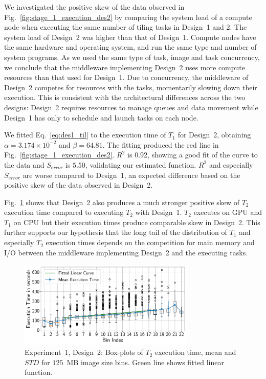 We investigated the positive skew of the data observed in 
Fig.~\ref{fig:stage_1_execution_des2} by comparing the system load of a 
compute node when executing the same number of tiling tasks in Design~1 and 2. 
The system load of Design~2 was higher than that of Design~1. Compute nodes 
have the same hardware and operating system, and run the same type and number 
of system programs. As we used the same type of task, image and task 
concurrency, we conclude that the middleware implementing Design~2 uses more 
compute resources than that used for Design~1. Due to concurrency, the 
middleware of Design~2 competes for resources with the tasks, momentarily 
slowing down their execution. This is consistent with the architectural 
differences across the two designs: Design~2 requires resources to manage 
queues and data movement while Design~1 has only to schedule and launch tasks 
on each node.

We fitted Eq.~\ref{eq:des1_til} to the execution time of $T_1$ for Design~2, 
obtaining $\alpha = 3.174 \times 10^{-2}$ and $\beta = 64.81$. The fitting 
produced the red line in Fig.~\ref{fig:stage_1_execution_des2}. $R^{2}$ is 
$0.92$, showing a good fit of the curve to the data and $S_{error}$ is $5.50$, 
validating our estimated function. $R^2$ and especially $S_{error}$ are worse 
compared to Design~1, an expected difference based on the positive skew of the 
data observed in Design~2.


Fig.~\ref{fig:stage_2_execution_des2} shows that Design~2 also produces a much 
stronger positive skew of $T_{2}$ execution time compared to executing $T_{2}$ 
with Design~1. $T_{2}$ executes on GPU and $T_{1}$ on CPU but their execution 
times produce comparable skew in Design~2. This further supports our 
hypothesis that the long tail of the distribution of $T_{1}$ and especially 
$T_{2}$ execution times depends on the competition for main memory and I/O 
between the middleware implementing Design~2 and the executing tasks.


\begin{figure}[t]
    \centering
    \includegraphics[width=0.75\textwidth]{figures/designs/stage_1_tx_box_des2.pdf}
    \caption{Experiment~1, Design~2: Box-plots of $T_{2}$ execution time, mean 
    and $STD$ for $125$~MB image size bins. Green line shows fitted linear 
    function.}
    \label{fig:stage_2_execution_des2}
\end{figure}

